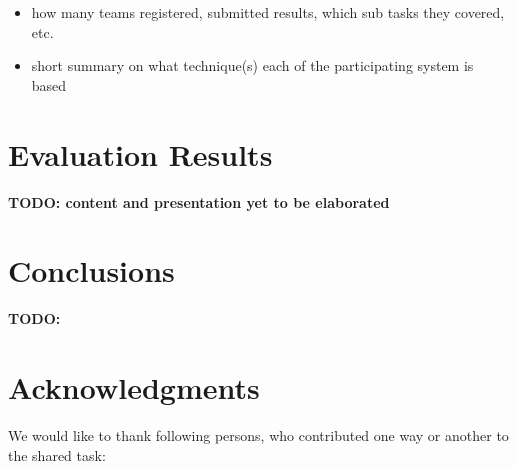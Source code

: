 \documentclass[11pt]{article}
\begin{document}
\begin{itemize}

\item how many teams registered, submitted results, which sub tasks they covered, etc.

\item short summary on what technique(s) each of the participating system is based

\end{itemize}

\section{Evaluation Results}
\label{sec:results}

\textbf{TODO: content and presentation yet to be elaborated}

\section{Conclusions}
\label{sec:conclusions}

\textbf{TODO:}

\section*{Acknowledgments}

We would like to thank following persons, who contributed one way or another to the shared task:



\end{document}
